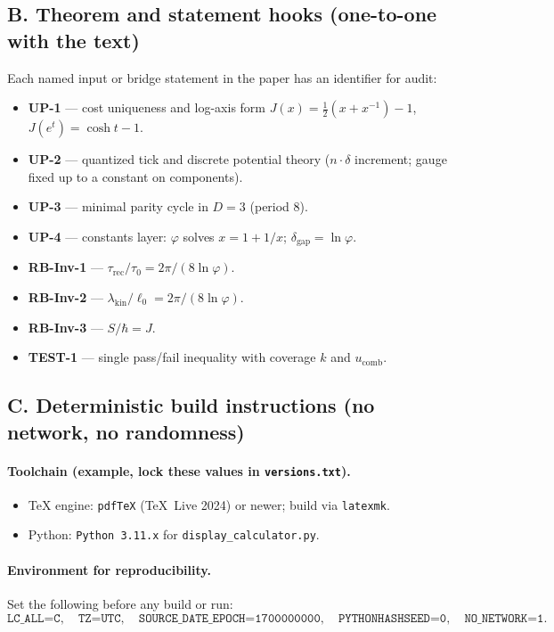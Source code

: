 \documentclass[11pt]{article}
\begin{document}
\subsection*{B. Theorem and statement hooks (one-to-one with the text)}
Each named input or bridge statement in the paper has an identifier for audit:
\begin{itemize}
  \item \textbf{UP-1} — cost uniqueness and log-axis form \(J(x)=\tfrac12(x+x^{-1})-1\), \(J(e^{t})=\cosh t-1\).
  \item \textbf{UP-2} — quantized tick and discrete potential theory (\(n\cdot\delta\) increment; gauge fixed up to a constant on components).
  \item \textbf{UP-3} — minimal parity cycle in \(D=3\) (period \(8\)).
  \item \textbf{UP-4} — constants layer: \(\varphi\) solves \(x=1+1/x\); \(\delta_{\mathrm{gap}}=\ln\varphi\).
  \item \textbf{RB-Inv-1} — \(\tau_{\mathrm{rec}}/\tau_{0}=2\pi/(8\ln\varphi)\).
  \item \textbf{RB-Inv-2} — \(\lambda_{\mathrm{kin}}/\ell_{0}=2\pi/(8\ln\varphi)\).
  \item \textbf{RB-Inv-3} — \(S/\hbar=J\).
  \item \textbf{TEST-1} — single pass/fail inequality with coverage \(k\) and \(u_{\mathrm{comb}}\).
\end{itemize}

\subsection*{C. Deterministic build instructions (no network, no randomness)}
\paragraph{Toolchain (example, lock these values in \texttt{versions.txt}).}
\begin{itemize}
  \item TeX engine: \texttt{pdfTeX} (TeX~Live 2024) or newer; build via \texttt{latexmk}.
  \item Python: \texttt{Python 3.11.x} for \texttt{display\_calculator.py}.
\end{itemize}

\paragraph{Environment for reproducibility.}
Set the following before any build or run:
\[
\texttt{LC\_ALL=C},\quad
\texttt{TZ=UTC},\quad
\texttt{SOURCE\_DATE\_EPOCH=1700000000},\quad
\texttt{PYTHONHASHSEED=0},\quad
\texttt{NO\_NETWORK=1}.
\]
\end{document}
